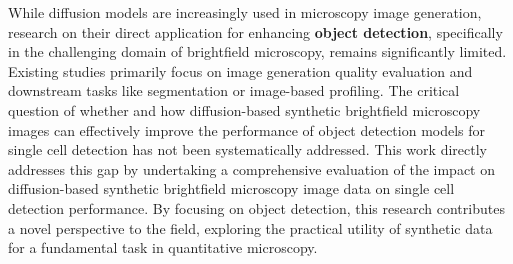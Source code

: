 While diffusion models are increasingly used in microscopy image generation, research on their direct application for enhancing \textbf{object detection}, specifically in the challenging domain of brightfield microscopy, remains significantly limited.
Existing studies primarily focus on image generation quality evaluation and downstream tasks like segmentation or image-based profiling.
The critical question of whether and how diffusion-based synthetic brightfield microscopy images can effectively improve the performance of object detection models for single cell detection has not been systematically addressed.
This work directly addresses this gap by undertaking a comprehensive evaluation of the impact on diffusion-based synthetic brightfield microscopy image data on single cell detection performance.
By focusing on object detection, this research contributes a novel perspective to the field, exploring the practical utility of synthetic data for a fundamental task in quantitative microscopy.

